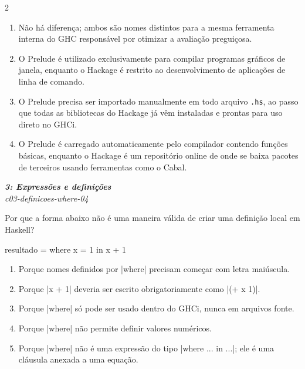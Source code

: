 \documentclass[a4paper,10pt,brazil]{article}
\begin{document}
\begin{multicols}{2}
\begin{enumerate}
  \item Não há diferença; ambos são nomes distintos para a mesma ferramenta interna do GHC responsável por otimizar a avaliação preguiçosa.

  \item O Prelude é utilizado exclusivamente para compilar programas gráficos de janela, enquanto o Hackage é restrito ao desenvolvimento de aplicações de linha de comando.

  \item O Prelude precisa ser importado manualmente em todo arquivo \texttt{.hs}, ao passo que todas as bibliotecas do Hackage já vêm instaladas e prontas para uso direto no GHCi.

  \item O Prelude é carregado automaticamente pelo compilador contendo funções básicas, enquanto o Hackage é um repositório online de onde se baixa pacotes de terceiros usando ferramentas como o Cabal.


\end{enumerate}

\begin{flushright}
  \footnotesize
  \textit{\textbf{3: Expressões e definições}}\\
  \textit{c03-definicoes-where-04}\\

\end{flushright}
Por que a forma abaixo não é uma maneira válida de criar uma definição local em Haskell?

\begin{haskellcode}
resultado = where x = 1 in x + 1
\end{haskellcode}

\begin{enumerate}
  \item Porque nomes definidos por \haskellinline|where| precisam começar com letra maiúscula.

  \item Porque \haskellinline|x + 1| deveria ser escrito obrigatoriamente como \haskellinline|(+ x 1)|.

  \item Porque \haskellinline|where| só pode ser usado dentro do GHCi, nunca em arquivos fonte.

  \item Porque \haskellinline|where| não permite definir valores numéricos.

  \item Porque \haskellinline|where| não é uma expressão do tipo \haskellinline|where ... in ...|; ele é uma cláusula anexada a uma equação.



\end{enumerate}
\end{multicols}
\end{document}
